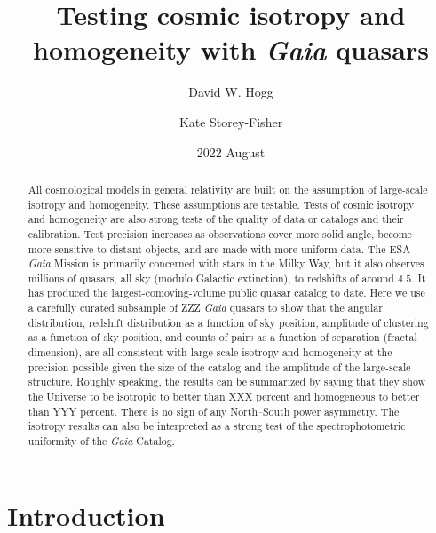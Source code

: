 \documentclass[modern]{aastex631}
\begin{document}
\title{%
Testing cosmic isotropy and homogeneity
with \textsl{Gaia} quasars}
\author[0000-0003-2866-9403]{David W. Hogg}

\author[0000-0001-8764-7103]{Kate Storey-Fisher}

\date{2022 August}

\begin{abstract}\noindent
All cosmological models in general relativity are built on the assumption of large-scale isotropy and homogeneity.
These assumptions are testable.
Tests of cosmic isotropy and homogeneity are also strong tests of the quality of data or catalogs and their calibration.
Test precision increases as observations cover more solid angle, become more sensitive to distant objects, and are made with more uniform data.
The ESA \textsl{Gaia} Mission is primarily concerned with stars in the Milky Way, but it also observes millions of quasars, all sky (modulo Galactic extinction), to redshifts of around $4.5$.
It has produced the largest-comoving-volume public quasar catalog to date.
Here we use a carefully curated subsample of ZZZ \textsl{Gaia} quasars to show that the angular distribution, redshift distribution as a function of sky position, amplitude of clustering as a function of sky position, and counts of pairs as a function of separation (fractal dimension), are all consistent with large-scale isotropy and homogeneity at the precision possible given the size of the catalog and the amplitude of the large-scale structure.
Roughly speaking, the results can be summarized by saying that they show the Universe to be isotropic to better than XXX percent and homogeneous to better than YYY percent.
There is no sign of any North--South power asymmetry.
The isotropy results can also be interpreted as a strong test of the spectrophotometric uniformity of the \textsl{Gaia} Catalog.
\end{abstract}

\section*{}
\clearpage
\section{Introduction}
\end{document}
